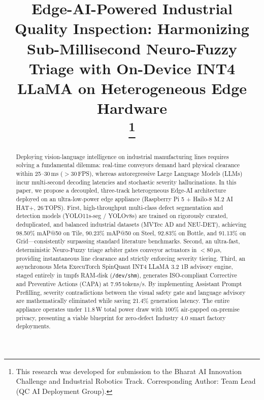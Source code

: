 \documentclass[conference]{IEEEtran}
\begin{document}
\title{Edge-AI-Powered Industrial Quality Inspection: Harmonizing Sub-Millisecond Neuro-Fuzzy Triage with On-Device INT4 LLaMA on Heterogeneous Edge Hardware\\
\thanks{This research was developed for submission to the Bharat AI Innovation Challenge and Industrial Robotics Track. Corresponding Author: Team Lead (QC AI Deployment Group).}
}

\author{
}

\maketitle

\begin{abstract}
Deploying vision-language intelligence on industrial manufacturing lines requires solving a fundamental dilemma: real-time conveyors demand hard physical clearance within 25--30\,ms ($>$30\,FPS), whereas autoregressive Large Language Models (LLMs) incur multi-second decoding latencies and stochastic severity hallucinations. In this paper, we propose a decoupled, three-track heterogeneous Edge-AI architecture deployed on an ultra-low-power edge appliance (Raspberry Pi 5 + Hailo-8 M.2 AI HAT+, 26\,TOPS). 
First, high-throughput multi-class defect segmentation and detection models (YOLO11s-seg / YOLOv8s) are trained on rigorously curated, deduplicated, and balanced industrial datasets (MVTec AD and NEU-DET), achieving 98.50\% mAP@50 on Tile, 90.23\% mAP@50 on Steel, 92.83\% on Bottle, and 91.13\% on Grid---consistently surpassing standard literature benchmarks. Second, an ultra-fast, deterministic Neuro-Fuzzy triage arbiter gates conveyor actuators in $<80\,\mu$s, providing instantaneous line clearance and strictly enforcing severity tiering. Third, an asynchronous Meta ExecuTorch SpinQuant INT4 LLaMA 3.2 1B advisory engine, staged entirely in tmpfs RAM-disk (\texttt{/dev/shm}), generates ISO-compliant Corrective and Preventive Actions (CAPA) at 7.95\,tokens/s. By implementing Assistant Prompt Prefilling, severity contradictions between the visual safety gate and language advisory are mathematically eliminated while saving 21.4\% generation latency. The entire appliance operates under 11.8\,W total power draw with 100\% air-gapped on-premise privacy, presenting a viable blueprint for zero-defect Industry 4.0 smart factory deployments.
\end{abstract}
\end{document}
